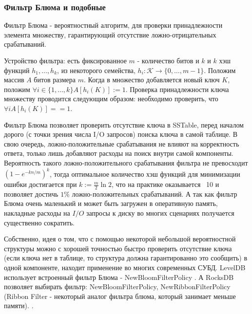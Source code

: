 \subsubsection{Фильтр Блюма и подобные}

Фильтр Блюма - вероятностный алгоритм, для проверки принадлежности элемента множеству, гарантирующий отсутствие ложно-отрицательных срабатываний.

Устройство фильтра: есть фиксированное $m$ - количество битов и $k$ и $k$ хэш функций $h_1, \ldots, h_k $, из некоторого семейства, $h_i:\mathcal{K}\rightarrow \{0, \ldots, m-1 \}$. Положим массив $A$ битов размера $m$. Когда в множество добавляется новый ключ $K$, положим $\forall i \in \{1, \ldots, k\} A[h_i(K)] := 1$. Проверка принадлежности ключа множеству проводится следующим образом: необходимо проверить, что $\forall i A[h_i(K)] == 1$.


Фильтр Блюма позволяет проверить отсутствие ключа в SSTable, перед началом дорого (с точки зрения числа I/O запросов) поиска ключа в самой таблице. В свою очередь, ложно-положительные срабатывания не влияют на корректность ответа, только лишь добавляют расходы на поиск внутри самой компоненты. Вероятность такого  ложно-положительного срабатывания фильтра не превосходит $(1 - e ^ {-kn / m})^k$, тогда оптимальное количество хэш  функций для минимизации ошибки достигается при $k:=\frac{m}{2}\ln 2$, что на практике оказывается ~10 и позволяет достичь $1\%$ ложно-положительных срабатываний. А так как фильтр Блюма очень маленький и может быть загружен в оперативную память, накладные расходы на $I/O$ запросы к диску во многих сценариях получается существенно сократить.

Собственно, идея о том, что с помощью некоторой небольшой вероятностной структуры можно с хорошей точностью быстро проверить отсутствие ключа (если ключа нет в таблице, то структура должна гарантированно это сообщить) в одной компоненте, находит применение во многих современных СУБД. LevelDB использует встроенный фильтр Блюма - NewBloomFilterPolicy \cite{leveldbgit}. А RocksDB позволяет выбирать фильтр: NewBloomFilterPolicy, NewRibbonFilterPolicy (Ribbon Filter - некоторый аналог фильтра блюма, который занимает меньше памяти).
 \cite{rocksdbgit}.